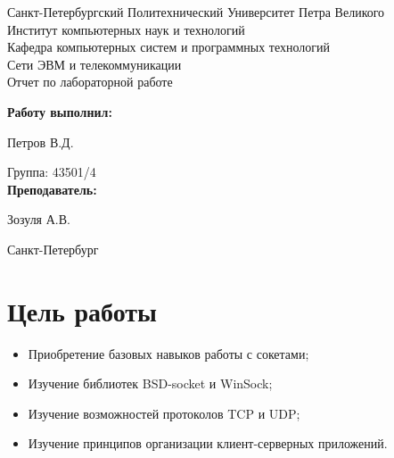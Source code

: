 \documentclass[a4paper]{article}
\begin{document}
\begin{titlepage}

\begin{center}

\large Санкт-Петербургский Политехнический Университет Петра Великого\\
\large Институт компьютерных наук и технологий \\
\large Кафедра компьютерных систем и программных технологий\\[6cm]

\huge Сети ЭВМ и телекоммуникации\\[0.5cm]
\large Отчет по лабораторной работе\\[5cm]
\end{center}

\begin{flushright}
\begin{minipage}{0.5\textwidth}
\begin{flushright}
\textbf{Работу выполнил:}

Петров В.Д.

{Группа:} 43501/4\\


\textbf{Преподаватель:} 

Зозуля А.В.
\end{flushright}
\end{minipage} %
\end{flushright} %

\vfill %

\begin{center}

\large Санкт-Петербург\\
\large \the\year %

\end{center} %

\thispagestyle{empty} %
\end{titlepage} %

\vfill %

\section{Цель работы}
\begin{itemize}
\item Приобретение базовых навыков работы с сокетами;
\item Изучение библиотек BSD-socket и WinSock;
\item Изучение возможностей протоколов TCP и UDP;
\item Изучение принципов организации клиент-серверных приложений.
\end{itemize}
\end{document}
